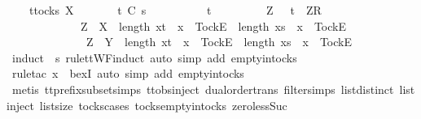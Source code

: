 \begin{isabellebody}
\ \ \ \ {\isacharparenleft}{\isasymexists}t{\isasymin}tocks\ X{\isachardot}\isanewline
\ \ \ \ \ \ \ t\ {\isasymlesssim}\isactrlsub C\ s\ {\isasymand}\isanewline
\ \ \ \ \ \ \ {\isacharparenleft}{\isasymrho}\ {\isacharequal}\ t\ {\isasymor}\isanewline
\ \ \ \ \ \ \ \ {\isacharparenleft}{\isasymexists}Z{\isachardot}\ {\isasymrho}\ {\isacharequal}\ t\ {\isacharat}\ {\isacharbrackleft}{\isacharbrackleft}Z{\isacharbrackright}\isactrlsub R{\isacharbrackright}\ {\isasymand}\isanewline
\ \ \ \ \ \ \ \ \ \ \ \ \ {\isacharparenleft}Z\ {\isasymsubseteq}\ X\ {\isasymand}\ length\ {\isacharbrackleft}x{\isasymleftarrow}t\ {\isachardot}\ x\ {\isacharequal}\ {\isacharbrackleft}Tock{\isacharbrackright}\isactrlsub E{\isacharbrackright}\ {\isacharless}\ length\ {\isacharbrackleft}x{\isasymleftarrow}s\ {\isachardot}\ x\ {\isacharequal}\ {\isacharbrackleft}Tock{\isacharbrackright}\isactrlsub E{\isacharbrackright}\ {\isasymor}\isanewline
\ \ \ \ \ \ \ \ \ \ \ \ \ \ Z\ {\isasymsubseteq}\ Y\ {\isasymand}\ length\ {\isacharbrackleft}x{\isasymleftarrow}t\ {\isachardot}\ x\ {\isacharequal}\ {\isacharbrackleft}Tock{\isacharbrackright}\isactrlsub E{\isacharbrackright}\ {\isacharequal}\ length\ {\isacharbrackleft}x{\isasymleftarrow}s\ {\isachardot}\ x\ {\isacharequal}\ {\isacharbrackleft}Tock{\isacharbrackright}\isactrlsub E{\isacharbrackright}{\isacharparenright}{\isacharparenright}{\isacharparenright}{\isacharparenright}{\isachardoublequoteclose}\isanewline
\ \ \ \ \isamarkupfalse%
\ {\isacharparenleft}induct\ {\isasymrho}\ s\ rule{\isacharcolon}ttWF{}{\isachardot}induct{\isacharcomma}\ auto\ simp\ add{\isacharcolon}\ empty{\isacharunderscore}in{\isacharunderscore}tocks{\isacharparenright}\isanewline
\ \ \ \ \isamarkupfalse%
\ {\isacharparenleft}rule{\isacharunderscore}tac\ x{\isacharequal}{\isachardoublequoteopen}{\isacharbrackleft}{\isacharbrackright}{\isachardoublequoteclose}\ \ bexI{\isacharcomma}\ auto\ simp\ add{\isacharcolon}\ empty{\isacharunderscore}in{\isacharunderscore}tocks{\isacharparenright}\isanewline
\ \ \ \ \isamarkupfalse%
\ {\isacharparenleft}metis\ tt{\isacharunderscore}prefix{\isacharunderscore}subset{\isachardot}simps{\isacharparenleft}{}{\isacharparenright}\ ttobs{\isachardot}inject{\isacharparenleft}{}{\isacharparenright}\ dual{\isacharunderscore}order{\isachardot}trans\ filter{\isachardot}simps{\isacharparenleft}{}{\isacharparenright}\ list{\isachardot}distinct{\isacharparenleft}{}{\isacharparenright}\ list{\isachardot}inject\ list{\isachardot}size{\isacharparenleft}{}{\isacharparenright}\ tocks{\isachardot}cases\ tocks{\isachardot}empty{\isacharunderscore}in{\isacharunderscore}tocks\ zero{\isacharunderscore}less{\isacharunderscore}Suc{\isacharparenright}\isanewline

\end{isabellebody}

